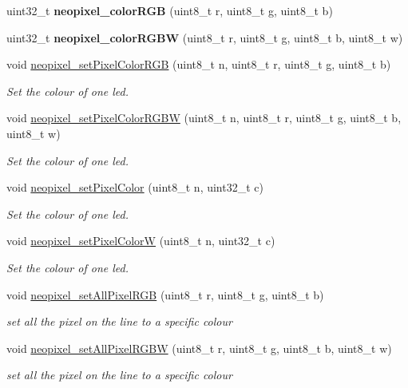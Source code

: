 \begin{DoxyCompactItemize}
uint32\+\_\+t {\bfseries neopixel\+\_\+color\+R\+GB} (uint8\+\_\+t r, uint8\+\_\+t g, uint8\+\_\+t b)
\item 
\mbox{\label{group___neo_pixel_ga70ca37e59d1bf154f1426c8eeb5c1cf2}} 
uint32\+\_\+t {\bfseries neopixel\+\_\+color\+R\+G\+BW} (uint8\+\_\+t r, uint8\+\_\+t g, uint8\+\_\+t b, uint8\+\_\+t w)
\item 
void \hyperlink{group___neo_pixel_gadbf8ae449ade0b6015cb75632182b04c}{neopixel\+\_\+set\+Pixel\+Color\+R\+GB} (uint8\+\_\+t n, uint8\+\_\+t r, uint8\+\_\+t g, uint8\+\_\+t b)
\begin{DoxyCompactList}\small\item\em Set the colour of one led. \end{DoxyCompactList}\item 
void \hyperlink{group___neo_pixel_ga8eb6ad73b1bd1df8bddc2615035a3371}{neopixel\+\_\+set\+Pixel\+Color\+R\+G\+BW} (uint8\+\_\+t n, uint8\+\_\+t r, uint8\+\_\+t g, uint8\+\_\+t b, uint8\+\_\+t w)
\begin{DoxyCompactList}\small\item\em Set the colour of one led. \end{DoxyCompactList}\item 
void \hyperlink{group___neo_pixel_ga71a91c14cda530d83c6bbb241fc9bf96}{neopixel\+\_\+set\+Pixel\+Color} (uint8\+\_\+t n, uint32\+\_\+t c)
\begin{DoxyCompactList}\small\item\em Set the colour of one led. \end{DoxyCompactList}\item 
void \hyperlink{group___neo_pixel_gaff8fc0f23014295654811a1ec909f204}{neopixel\+\_\+set\+Pixel\+ColorW} (uint8\+\_\+t n, uint32\+\_\+t c)
\begin{DoxyCompactList}\small\item\em Set the colour of one led. \end{DoxyCompactList}\item 
void \hyperlink{group___neo_pixel_ga7a6c2dc149e86a788aede1d6aa5262d7}{neopixel\+\_\+set\+All\+Pixel\+R\+GB} (uint8\+\_\+t r, uint8\+\_\+t g, uint8\+\_\+t b)
\begin{DoxyCompactList}\small\item\em set all the pixel on the line to a specific colour \end{DoxyCompactList}\item 
void \hyperlink{group___neo_pixel_ga1ba017c1f338ef2c8e4a48acae35d87e}{neopixel\+\_\+set\+All\+Pixel\+R\+G\+BW} (uint8\+\_\+t r, uint8\+\_\+t g, uint8\+\_\+t b, uint8\+\_\+t w)
\begin{DoxyCompactList}\small\item\em set all the pixel on the line to a specific colour \end{DoxyCompactList}\end{DoxyCompactItemize}



